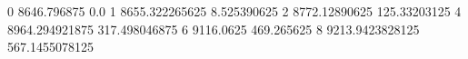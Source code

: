 0 8646.796875 0.0
1 8655.322265625 8.525390625
2 8772.12890625 125.33203125
4 8964.294921875 317.498046875
6 9116.0625 469.265625
8 9213.9423828125 567.1455078125
